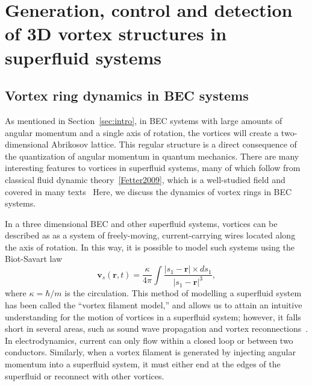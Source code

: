 \chapter{Generation, control and detection of 3D vortex structures in superfluid systems}
\label{ch:vortex_states}

\section{Vortex ring dynamics in BEC systems}
\label{sec:vortex}

As mentioned in Section~\ref{sec:intro}, in BEC systems with large amounts of angular momentum and a single axis of rotation, the vortices will create a two-dimensional Abrikosov lattice. 
This regular structure is a direct consequence of the quantization of angular momentum in quantum mechanics.
There are many interesting features to vortices in superfluid systems, many of which follow from classical fluid dynamic theory~\ref{Fetter2009}, which is a well-studied field and covered in many texts~\cite{Faber1995, Kundu2012, Tritton1988, Landau1987}
Here, we discuss the dynamics of vortex rings in BEC systems.

In a three dimensional BEC and other superfluid systems, vortices can be described as as a system of freely-moving, current-carrying wires located along the axis of rotation. 
In this way, it is possible to model such systems using the Biot-Savart law ~\cite{Schwarz1985}
\begin{equation}
    \boldsymbol{v}_s(\boldsymbol{r},t) = \frac{\kappa}{4\pi}\int\frac{|s_1-\boldsymbol{r}|\times ds_1}{|s_1-\boldsymbol{r}|^3},
\label{eqn:BS}
\end{equation}
where $\kappa = \hbar / m$ is the circulation. 
This method of modelling a superfluid system has been called the ``vortex filament model,'' and allows us to attain an intuitive understanding for the motion of vortices in a superfluid system; however, it falls short in several areas, such as sound wave propagation and vortex reconnections~\cite{Zuccher2012}. 
In electrodynamics, current can only flow within a closed loop or between two conductors.
Similarly, when a vortex filament is generated by injecting angular momentum into a superfluid system, it must either end at the edges of the superfluid or reconnect with other vortices.

